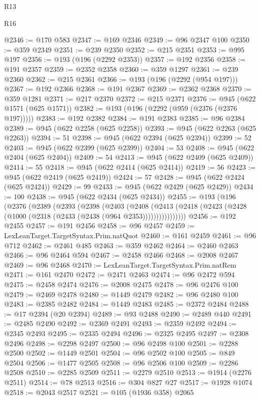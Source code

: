 \begin{lexlean}{R13}
\begin{lexlean}{R16}
\begin{coremodule}
{{{{{{{{{{{{{{{{{{{{{{{{{{{{{{{{{{{{{{{{{{{{{{{{{{{{{{{{{{{{{{{{{{{{{{{{{{{{{{{{{{{{{{{{{{{{{{{{{{{{{{{{{{{{{{{{{@2346 := @170 @583
@2347 := @169 @2346
@2349 := @96 @2347 @100
@2350 := @359 @2349
@2351 := @239 @2350
@2352 := @215 @2351
@2353 := @995 @197
@2356 := @193 (@196 (@2292 @2353))
@2357 := @192 @2356
@2358 := @191 @2357
@2359 := @2352 @2358
@2360 := @359 @1297
@2361 := @239 @2360
@2362 := @215 @2361
@2366 := @193 (@196 (@2292 (@954 @197)))
@2367 := @192 @2366
@2368 := @191 @2367
@2369 := @2362 @2368
@2370 := @359 @1281
@2371 := @217 @2370
@2372 := @215 @2371
@2376 := @945 (@622 @1571 (@625 @1571))
@2382 := @193 (@196 (@2292 (@959 (@2376 (@2376 @197)))))
@2383 := @192 @2382
@2384 := @191 @2383
@2385 := @96 @2384
@2389 := @945 (@622 @2258 (@625 @2258))
@2393 := @945 (@622 @2263 (@625 @2263))
@2394 := 51
@2398 := @945 (@622 @2394 (@625 @2394))
@2399 := 52
@2403 := @945 (@622 @2399 (@625 @2399))
@2404 := 53
@2408 := @945 (@622 @2404 (@625 @2404))
@2409 := 54
@2413 := @945 (@622 @2409 (@625 @2409))
@2414 := 55
@2418 := @945 (@622 @2414 (@625 @2414))
@2419 := 56
@2423 := @945 (@622 @2419 (@625 @2419))
@2424 := 57
@2428 := @945 (@622 @2424 (@625 @2424))
@2429 := 99
@2433 := @945 (@622 @2429 (@625 @2429))
@2434 := 100
@2438 := @945 (@622 @2434 (@625 @2434))
@2455 := @193
    (@196
      (@2376
        (@2389
          (@2393
            (@2398
              (@2403
                (@2408
                  (@2413
                    (@2418 (@2423 (@2428 (@1000 (@2318 (@2433 (@2438 (@964 @2353))))))))))))))))
@2456 := @192 @2455
@2457 := @191 @2456
@2458 := @96 @2457
@2459 := LexLeanTarget.TargetSyntax.Prim.natQuot
@2460 := @161 @2459
@2461 := @96 @712
@2462 := @2461 @485
@2463 := @359 @2462
@2464 := @2460 @2463
@2466 := @96 @2464 @594
@2467 := @2458 @2466
@2468 := @2008 @2467
@2469 := @96 @2468
@2470 := LexLeanTarget.TargetSyntax.Prim.natRem
@2471 := @161 @2470
@2472 := @2471 @2463
@2474 := @96 @2472 @594
@2475 := @2458 @2474
@2476 := @2008 @2475
@2478 := @96 @2476 @100
@2479 := @2469 @2478
@2480 := @1449 @2479
@2482 := @96 @2480 @100
@2483 := @2385 @2482
@2484 := @1449 @2483
@2485 := @2372 @2484
@2488 := @17 @2394 (@20 @2394)
@2489 := @93 @2488
@2490 := @2489 @440
@2491 := @2485 @2490
@2492 := @2369 @2491
@2493 := @2359 @2492
@2494 := @2345 @2493
@2495 := @2335 @2494
@2496 := @2325 @2495
@2497 := @2308 @2496
@2498 := @2298 @2497
@2500 := @96 @2498 @100
@2501 := @2288 @2500
@2502 := @1449 @2501
@2504 := @96 @2502 @100
@2505 := @849 @2504
@2506 := @1477 @2505
@2508 := @96 @2506 @100
@2509 := @2286 @2508
@2510 := @2285 @2509
@2511 := @2279 @2510
@2513 := @1914 (@2276 @2511)
@2514 := @78 @2513
@2516 := @304 @827 @27
@2517 := @1928 @1074
@2518 := @2043 @2517
@2521 := @105 (@1936 @358) @2065
}}}}}}}}}}}}}}}}}}}}}}}}}}}}}}}}}}}}}}}}}}}}}}}}}}}}}}}}}}}}}}}}}}}}}}}}}}}}}}}}}}}}}}}}}}}}}}}}}}}}}}}}}}}}}}}}}
\end{coremodule}
\end{lexlean}
\end{lexlean}
